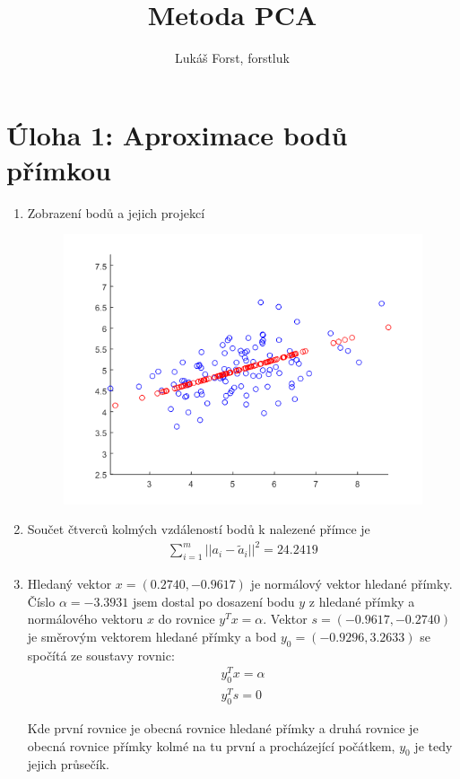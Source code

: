 \documentclass[12pt]{article}
\begin{document}
\title{Metoda PCA}
\author{Lukáš Forst, forstluk}
\maketitle

\section{Úloha 1: Aproximace bodů přímkou}
\begin{enumerate}
\item Zobrazení bodů a jejich projekcí
\begin{figure}[H]
\centering
\includegraphics{task1.png}
\end{figure}

\item Součet čtverců kolmých vzdáleností bodů k nalezené přímce je
\begin{gather*}
\sum_{i=1}^{m} ||a_i-\tilde{a}_i||^2 = 24.2419
\end{gather*}

\item Hledaný vektor $x = (0.2740, -0.9617)$ je normálový vektor hledané přímky. Číslo $\alpha = -3.3931$ jsem dostal po dosazení bodu $y$ z hledané přímky a normálového vektoru $x$ do rovnice $y^Tx = \alpha$. Vektor $s = (-0.9617, -0.2740)$ je směrovým vektorem hledané přímky a bod $y_{0} = (-0.9296, 3.2633)$ se spočítá ze soustavy rovnic:
\begin{gather*}
y_0^Tx  = \alpha \\
y_0^Ts = 0
\end{gather*}

Kde první rovnice je obecná rovnice hledané přímky a druhá rovnice je obecná rovnice přímky kolmé na tu první a procházející počátkem, $y_0$ je tedy jejich průsečík.

\end{enumerate}
\end{document}
